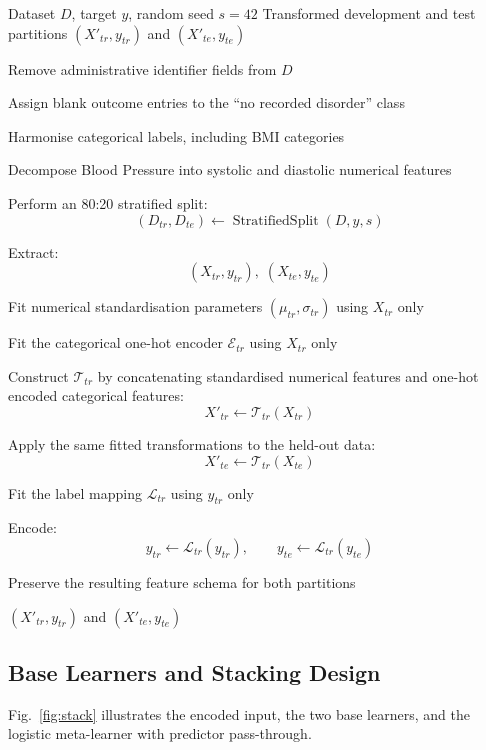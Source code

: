 \documentclass[a4paper,fleqn]{cas-dc}
\begin{document}
\begin{algorithm}[tbp]
\caption{Leakage-Controlled Data Preparation and Feature Transformation}
\label{alg:prep}
\small
\setlength{\abovedisplayskip}{3pt}
\setlength{\belowdisplayskip}{3pt}
\begin{algorithmic}[1]

\Require Dataset $D$, target $y$, random seed $s=42$
\Ensure Transformed development and test partitions
$(X'_{tr},y_{tr})$ and $(X'_{te},y_{te})$

\State Remove administrative identifier fields from $D$

\State Assign blank outcome entries to the
``no recorded disorder'' class

\State Harmonise categorical labels, including BMI categories

\State Decompose Blood Pressure into systolic and
diastolic numerical features

\State Perform an 80:20 stratified split:
\[
(D_{tr},D_{te})\leftarrow
\operatorname{StratifiedSplit}(D,y,s)
\]

\State Extract:
\[
(X_{tr},y_{tr}),\;(X_{te},y_{te})
\]

\State Fit numerical standardisation parameters
$(\mu_{tr},\sigma_{tr})$ using $X_{tr}$ only

\State Fit the categorical one-hot encoder
$\mathcal{E}_{tr}$ using $X_{tr}$ only

\State Construct $\mathcal{T}_{tr}$ by concatenating standardised numerical features and one-hot encoded categorical features:
\[
X'_{tr}\leftarrow\mathcal{T}_{tr}(X_{tr})
\]

\State Apply the same fitted transformations to the
held-out data:
\[
X'_{te}
\leftarrow
\mathcal{T}_{tr}(X_{te})
\]

\State Fit the label mapping $\mathcal{L}_{tr}$ using
$y_{tr}$ only

\State Encode:
\[
y_{tr}\leftarrow\mathcal{L}_{tr}(y_{tr}),
\qquad
y_{te}\leftarrow\mathcal{L}_{tr}(y_{te})
\]

\State Preserve the resulting feature schema for both partitions

\State \Return
$(X'_{tr},y_{tr})$ and $(X'_{te},y_{te})$

\end{algorithmic}
\end{algorithm}


\subsection{Base Learners and Stacking Design}
\label{sec:architecture}
Fig.~\ref{fig:stack} illustrates the encoded input, the two base learners, and the logistic meta-learner with predictor pass-through.
\end{document}
